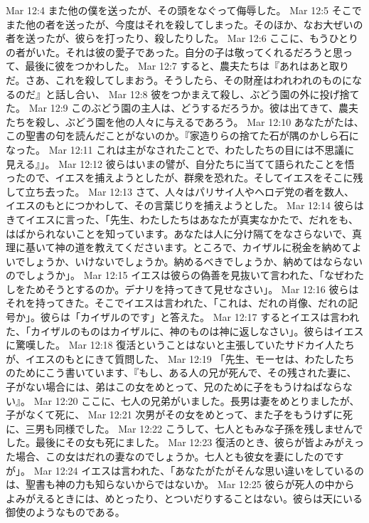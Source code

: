 Mar 12:4  また他の僕を送ったが、その頭をなぐって侮辱した。
Mar 12:5  そこでまた他の者を送ったが、今度はそれを殺してしまった。そのほか、なお大ぜいの者を送ったが、彼らを打ったり、殺したりした。
Mar 12:6  ここに、もうひとりの者がいた。それは彼の愛子であった。自分の子は敬ってくれるだろうと思って、最後に彼をつかわした。
Mar 12:7  すると、農夫たちは『あれはあと取りだ。さあ、これを殺してしまおう。そうしたら、その財産はわれわれのものになるのだ』と話し合い、
Mar 12:8  彼をつかまえて殺し、ぶどう園の外に投げ捨てた。
Mar 12:9  このぶどう園の主人は、どうするだろうか。彼は出てきて、農夫たちを殺し、ぶどう園を他の人々に与えるであろう。
Mar 12:10  あなたがたは、この聖書の句を読んだことがないのか。『家造りらの捨てた石が隅のかしら石になった。
Mar 12:11  これは主がなされたことで、わたしたちの目には不思議に見える』」。
Mar 12:12  彼らはいまの譬が、自分たちに当てて語られたことを悟ったので、イエスを捕えようとしたが、群衆を恐れた。そしてイエスをそこに残して立ち去った。
Mar 12:13  さて、人々はパリサイ人やヘロデ党の者を数人、イエスのもとにつかわして、その言葉じりを捕えようとした。
Mar 12:14  彼らはきてイエスに言った、「先生、わたしたちはあなたが真実なかたで、だれをも、はばかられないことを知っています。あなたは人に分け隔てをなさらないで、真理に基いて神の道を教えてくださいます。ところで、カイザルに税金を納めてよいでしょうか、いけないでしょうか。納めるべきでしょうか、納めてはならないのでしょうか」。
Mar 12:15  イエスは彼らの偽善を見抜いて言われた、「なぜわたしをためそうとするのか。デナリを持ってきて見せなさい」。
Mar 12:16  彼らはそれを持ってきた。そこでイエスは言われた、「これは、だれの肖像、だれの記号か」。彼らは「カイザルのです」と答えた。
Mar 12:17  するとイエスは言われた、「カイザルのものはカイザルに、神のものは神に返しなさい」。彼らはイエスに驚嘆した。
Mar 12:18  復活ということはないと主張していたサドカイ人たちが、イエスのもとにきて質問した、
Mar 12:19  「先生、モーセは、わたしたちのためにこう書いています、『もし、ある人の兄が死んで、その残された妻に、子がない場合には、弟はこの女をめとって、兄のために子をもうけねばならない』。
Mar 12:20  ここに、七人の兄弟がいました。長男は妻をめとりましたが、子がなくて死に、
Mar 12:21  次男がその女をめとって、また子をもうけずに死に、三男も同様でした。
Mar 12:22  こうして、七人ともみな子孫を残しませんでした。最後にその女も死にました。
Mar 12:23  復活のとき、彼らが皆よみがえった場合、この女はだれの妻なのでしょうか。七人とも彼女を妻にしたのですが」。
Mar 12:24  イエスは言われた、「あなたがたがそんな思い違いをしているのは、聖書も神の力も知らないからではないか。
Mar 12:25  彼らが死人の中からよみがえるときには、めとったり、とついだりすることはない。彼らは天にいる御使のようなものである。
